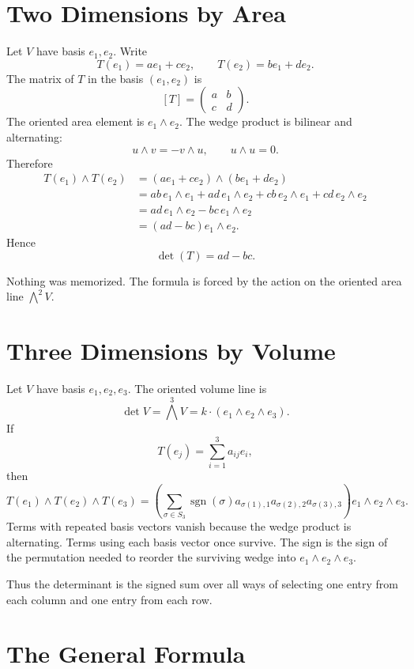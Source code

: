 \documentclass[11pt]{memoir}
\begin{document}
\section{Two Dimensions by Area}
\label{sec:two-dimensions-area}

Let \(V\) have basis \(e_{1},e_{2}\). Write
\[
  T(e_{1})=a e_{1}+c e_{2},\qquad
  T(e_{2})=b e_{1}+d e_{2}.
\]
The matrix of \(T\) in the basis \((e_{1},e_{2})\) is
\[
  [T]=
  \begin{pmatrix}
    a & b\\
    c & d
  \end{pmatrix}.
\]
The oriented area element is \(e_{1}\wedge e_{2}\). The wedge product
is bilinear and alternating:
\[
  u\wedge v=-v\wedge u,\qquad u\wedge u=0.
\]
Therefore
\begin{align*}
  T(e_{1})\wedge T(e_{2})
  &=(a e_{1}+c e_{2})\wedge(b e_{1}+d e_{2})\\
  &=ab\,e_{1}\wedge e_{1}
    +ad\,e_{1}\wedge e_{2}
    +cb\,e_{2}\wedge e_{1}
    +cd\,e_{2}\wedge e_{2}\\
  &=ad\,e_{1}\wedge e_{2}-bc\,e_{1}\wedge e_{2}\\
  &=(ad-bc)e_{1}\wedge e_{2}.
\end{align*}
Hence
\[
  \det(T)=ad-bc.
\]

Nothing was memorized. The formula is forced by the action on the
oriented area line \(\bigwedge^{2}V\).

\section{Three Dimensions by Volume}
\label{sec:three-dimensions-volume}

Let \(V\) have basis \(e_{1},e_{2},e_{3}\). The oriented volume line is
\[
  \det V=\bigwedge^{3}V=k\cdot(e_{1}\wedge e_{2}\wedge e_{3}).
\]
If
\[
  T(e_j)=\sum_{i=1}^{3}a_{ij}e_i,
\]
then
\[
  T(e_1)\wedge T(e_2)\wedge T(e_3)
  =
  \left(\sum_{\sigma\in S_3}\operatorname{sgn}(\sigma)
  a_{\sigma(1),1}a_{\sigma(2),2}a_{\sigma(3),3}\right)
  e_1\wedge e_2\wedge e_3.
\]
Terms with repeated basis vectors vanish because the wedge product is
alternating. Terms using each basis vector once survive. The sign is
the sign of the permutation needed to reorder the surviving wedge into
\(e_1\wedge e_2\wedge e_3\).

Thus the determinant is the signed sum over all ways of selecting one
entry from each column and one entry from each row.

\section{The General Formula}
\label{sec:general-formula}
\end{document}

